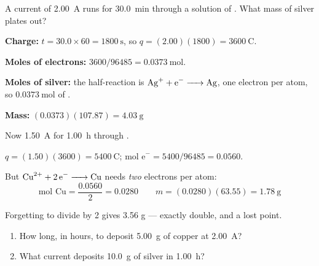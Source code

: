 \documentclass{apchem-notes}
\begin{document}
\begin{workedexample}
A current of \SI{2.00}{\ampere} runs for \SI{30.0}{\minute} through a
solution of . What mass of silver plates out?

\textbf{Charge:} $t = 30.0 \times 60 = \SI{1800}{\second}$, so
$q = (2.00)(1800) = \SI{3600}{\coulomb}$.

\textbf{Moles of electrons:}
$3600 / 96485 = \SI{0.0373}{\mole}$.

\textbf{Moles of silver:} the half-reaction is
$\ce{Ag+ + e^- -> Ag}$, one electron per atom, so
$\SI{0.0373}{\mole}$ of .

\textbf{Mass:} $(0.0373)(107.87) = \mathbf{4.03}~\text{g}$
\end{workedexample}

\begin{workedexample}
Now \SI{1.50}{\ampere} for \SI{1.00}{\hour} through .

$q = (1.50)(3600) = \SI{5400}{\coulomb}$;
$\text{mol e}^- = 5400/96485 = 0.0560$.

But $\ce{Cu^2+ + 2e^- -> Cu}$ needs \emph{two} electrons per atom:
\[ \text{mol Cu} = \frac{0.0560}{2} = 0.0280
   \qquad m = (0.0280)(63.55) = \mathbf{1.78}~\text{g} \]

Forgetting to divide by 2 gives 3.56 g --- exactly double, and a lost point.
\end{workedexample}


\begin{enumerate}[leftmargin=*,itemsep=0.4em]
  \item How long, in hours, to deposit \SI{5.00}{\gram} of copper at
        \SI{2.00}{\ampere}? \workspace[2.6cm]
  \item What current deposits \SI{10.0}{\gram} of silver in
        \SI{1.00}{\hour}? \workspace[2.4cm]
\end{enumerate}
\end{document}
